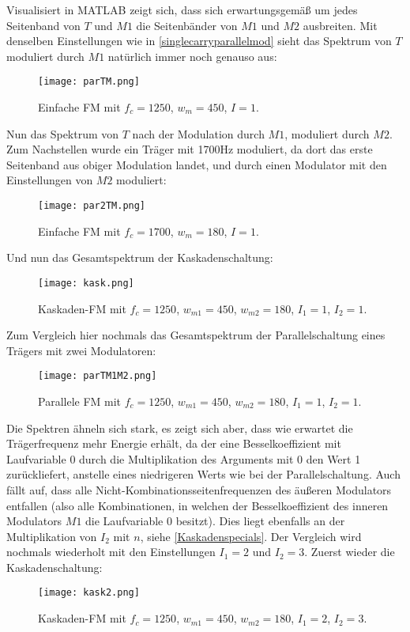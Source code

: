 Visualisiert in MATLAB zeigt sich, dass sich erwartungsgemäß um jedes Seitenband von $T$ und $M1$ die Seitenbänder von $M1$ und $M2$ ausbreiten. Mit denselben Einstellungen wie in \ref{singlecarryparallelmod} sieht das Spektrum von $T$ moduliert durch $M1$ natürlich immer noch genauso aus:
\FloatBarrier
\begin{figure} [ht]
\centering
  \texttt{[image: parTM.png]}
\caption{Einfache FM mit $f_c = 1250$, $w_m = 450$, $I = 1$. }
\end{figure}
\FloatBarrier
Nun das Spektrum von $T$ nach der Modulation durch $M1$, moduliert durch $M2$. Zum Nachstellen wurde ein Träger mit 1700Hz moduliert, da dort das erste Seitenband aus obiger Modulation landet, und durch einen Modulator mit den Einstellungen von $M2$ moduliert:
\FloatBarrier
\begin{figure} [ht]
\centering
  \texttt{[image: par2TM.png]}
\caption{Einfache FM mit $f_c = 1700$, $w_m = 180$, $I = 1$. }
\end{figure}
\FloatBarrier
Und nun das Gesamtspektrum der Kaskadenschaltung:
\FloatBarrier
\begin{figure} [ht]
\centering
  \texttt{[image: kask.png]}
\caption{Kaskaden-FM mit $f_c = 1250$, $w_{m1} = 450$, $w_{m2} = 180$, $I_1 = 1$, $I_2 = 1$. }
\end{figure}
\FloatBarrier
Zum Vergleich hier nochmals das Gesamtspektrum der Parallelschaltung eines Trägers mit zwei Modulatoren:
\FloatBarrier
\begin{figure} [ht]
\centering
  \texttt{[image: parTM1M2.png]}
\caption{Parallele FM mit $f_c = 1250$, $w_{m1} = 450$, $w_{m2} = 180$, $I_1 = 1$, $I_2 = 1$. }
\end{figure}
\FloatBarrier
Die Spektren ähneln sich stark, es zeigt sich aber, dass wie erwartet die Trägerfrequenz mehr Energie erhält, da der eine Besselkoeffizient mit Laufvariable $0$ durch die Multiplikation des Arguments mit $0$ den Wert 1 zurückliefert, anstelle eines niedrigeren Werts wie bei der Parallelschaltung. Auch fällt auf, dass alle Nicht-Kombinationsseitenfrequenzen des äußeren Modulators entfallen (also alle Kombinationen, in welchen der Besselkoeffizient des inneren Modulators $M1$ die Laufvariable $0$ besitzt). Dies liegt ebenfalls an der Multiplikation von $I_2$ mit $n$, siehe \ref{Kaskadenspecials}. 
Der Vergleich wird nochmals wiederholt mit den Einstellungen $I_1 = 2$ und $I_2 = 3$. Zuerst wieder die Kaskadenschaltung:
\FloatBarrier
\begin{figure} [ht]
\centering
  \texttt{[image: kask2.png]}
\caption{Kaskaden-FM mit $f_c = 1250$, $w_{m1} = 450$, $w_{m2} = 180$, $I_1 = 2$, $I_2 = 3$. }
\end{figure}
